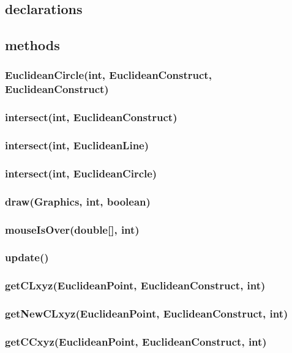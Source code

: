 \documentclass[a4paper,10pt]{report}
\begin{document}
\subsection{declarations}
\subsubsection{}
\subsection{methods}
\subsubsection{EuclideanCircle(int, EuclideanConstruct, EuclideanConstruct)}
\subsubsection{intersect(int, EuclideanConstruct)}
\subsubsection{intersect(int, EuclideanLine)}
\subsubsection{intersect(int, EuclideanCircle)}
\subsubsection{draw(Graphics, int, boolean)}
\subsubsection{mouseIsOver(double[], int)}
\subsubsection{update()}
\subsubsection{getCLxyz(EuclideanPoint, EuclideanConstruct, int)}
\subsubsection{getNewCLxyz(EuclideanPoint, EuclideanConstruct, int)}
\subsubsection{getCCxyz(EuclideanPoint, EuclideanConstruct, int)}
\end{document}
